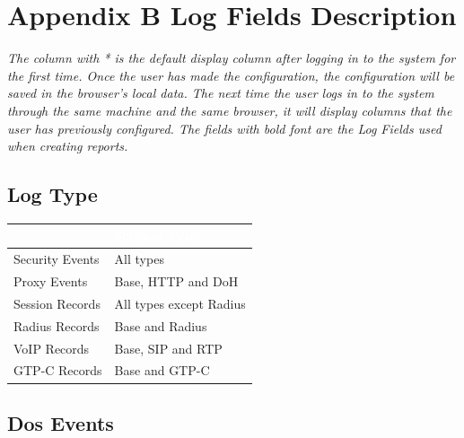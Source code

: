 %
\chapter*{\hypertarget{link:Appendix B Log Fields Description}{Appendix B Log Fields Description}}
\label{sec:appendix_c}

\notemark\textit{The column with * is the default display column after logging in to the system for the first time. Once the user has made the configuration, 
the configuration will be saved in the browser's local data. The next time the user logs in to the system through the same machine and the same browser, 
it will display columns that the user has previously configured. The fields with bold font are the Log Fields used when creating reports.}

\section*{\hypertarget{link:Log Type}{Log Type}}
\label{sec:appendix_c:logtype}

\begin{longtable}{p{}|p{}}   
    \rowcolor{black}\multicolumn{1}{l!\vlinewhite}{\textcolor{white}{Log Type}}  & \textcolor{white}{Schema Type} \\\hline  
    Security Events &	All types \\\hline 
    Proxy Events &	Base, HTTP and DoH \\\hline 
    Session Records &	All types except Radius \\\hline 
    Radius Records &	Base and Radius \\\hline 
    VoIP Records &	Base, SIP and RTP \\ \hline
    GTP-C Records &	Base and GTP-C \\ \hline
\end{longtable}

\section*{\hypertarget{link:Dos Events}{Dos Events}}
\label{sec:appendix_c:dosevents}

